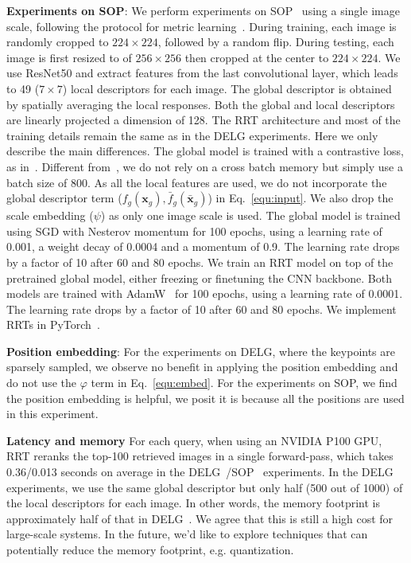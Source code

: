 \textbf{Experiments on SOP}:
We perform experiments on SOP~\cite{sop2016} using a single image scale, following the protocol for metric learning~\cite{XBM2020}.
During training, each image is randomly cropped to $224 \times 224$, followed by a random flip.
During testing,  each image is first resized to of $256 \times 256$ then cropped at the center to $224 \times 224$.
We use ResNet50 and extract features from the last convolutional layer, which leads to 49 ($7 \times 7$) local descriptors for each image.
The global descriptor is obtained by spatially averaging the local responses.
Both the global and local descriptors are linearly projected a dimension of 128. 
The RRT architecture and most of the training details remain the same as in the DELG experiments.
Here we only describe the main differences.
The global model is trained with a contrastive loss, as in~\cite{XBM2020}. 
Different from~\cite{XBM2020}, we do not rely on a cross batch memory but simply use a batch size of 800.
As all the local features are used, we do not incorporate the global descriptor term ($f_g(\mathbf{x}_g), \bar{f}_g(\mathbf{\bar{x}}_g)$) in Eq.~\ref{equ:input}.
We also drop the scale embedding ($\psi$) as only one image scale is used.
The global model is trained using SGD with Nesterov momentum for 100 epochs, using a learning rate of 0.001, a weight decay of 0.0004 and a momentum of 0.9. 
The learning rate drops by a factor of 10 after 60 and 80 epochs.
We train an RRT model on top of the pretrained global model, either freezing or finetuning the CNN backbone.
Both models are trained with AdamW~\cite{adamw2019} for 100 epochs, using a learning rate of 0.0001. 
The learning rate drops by a factor of 10 after 60 and 80 epochs. 
We implement RRTs in PyTorch~\cite{pytorch2019}. 


\textbf{Position embedding}:
For the experiments on DELG, where the keypoints are sparsely sampled, we observe no benefit in applying the position embedding and do not use the $\varphi$ term in Eq.~\ref{equ:embed}. For the experiments on SOP, we find the position embedding is helpful, we posit it is because all the positions are used in this experiment. 

\textbf{Latency and memory}
For each query, when using an NVIDIA P100 GPU, RRT reranks the top-100 retrieved images in a single forward-pass, which takes 0.36/0.013 seconds on average in the DELG~\cite{delg2020}/SOP~\cite{sop2016} experiments.
In the DELG experiments, we use the same global descriptor but only half (500 out of 1000) of the local descriptors for each image.
In other words, the memory footprint is approximately half of that in DELG~\cite{delg2020}. 
We agree that this is still a high cost for large-scale systems. 
In the future, we'd like to explore techniques that can potentially reduce the memory footprint, e.g. quantization.


